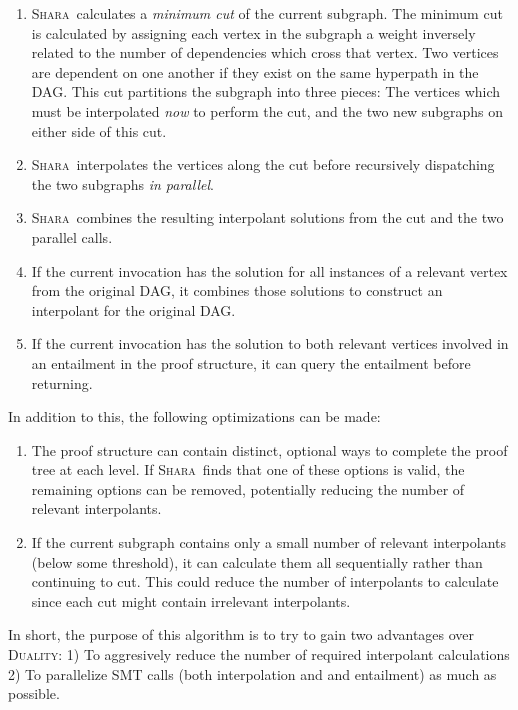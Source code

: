 \documentclass{article}
\newcommand{\DUALITY}{\textsc{Duality}}
\newcommand{\SHARA}{\textsc{Shara}}
\begin{document}
\begin{enumerate}
\item \SHARA~calculates a \emph{minimum cut} of the current subgraph. The
minimum cut is calculated by assigning each vertex in the subgraph a weight
inversely related to the number of dependencies which cross that vertex. Two
vertices are dependent on one another if they exist on the same hyperpath in
the DAG. This cut partitions the subgraph into three pieces: The vertices which
must be interpolated \emph{now} to perform the cut, and the two new subgraphs
on either side of this cut.
\item \SHARA~interpolates the vertices along the cut before recursively
dispatching the two subgraphs \emph{in parallel}.
\item \SHARA~combines the resulting interpolant solutions from the cut and the
two parallel calls.
\item If the current invocation has the solution for all instances of a
relevant vertex from the original DAG, it combines those solutions to construct
an interpolant for the original DAG.
\item If the current invocation has the solution to both relevant vertices
involved in an entailment in the proof structure, it can query the entailment
before returning.
\end{enumerate}

In addition to this, the following optimizations can be made:
\begin{enumerate}
\item The proof structure can contain distinct, optional ways to complete the
proof tree at each level. If \SHARA~finds that one of these options is valid,
the remaining options can be removed, potentially reducing the number of
relevant interpolants.
\item If the current subgraph contains only a small number of relevant
interpolants (below some threshold), it can calculate them all sequentially
rather than continuing to cut. This could reduce the number of interpolants to
calculate since each cut might contain irrelevant interpolants.
\end{enumerate}

In short, the purpose of this algorithm is to try to gain two advantages over
\DUALITY: 1) To aggresively reduce the number of required interpolant
calculations 2) To parallelize SMT calls (both interpolation and and
entailment) as much as possible.
\end{document}
